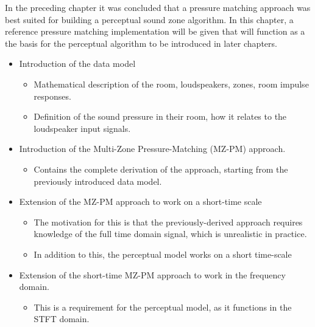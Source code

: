 In the preceding chapter it was concluded that a pressure matching approach was best suited for building a 
perceptual sound zone algorithm.
In this chapter, a reference pressure matching implementation will be given that will function as a the basis for the 
perceptual algorithm to be introduced in later chapters.
\begin{itemize}
    \item Introduction of the data model
        \begin{itemize}
            \item Mathematical description of the room, loudspeakers, zones, room impulse responses.
            \item Definition of the sound pressure in their room, how it relates to the loudspeaker input signals.
        \end{itemize}
    \item Introduction of the Multi-Zone Pressure-Matching (MZ-PM) approach.
        \begin{itemize}
            \item Contains the complete derivation of the approach, starting from the previously introduced data model.
        \end{itemize}
    \item Extension of the MZ-PM approach to work on a short-time scale
        \begin{itemize}
            \item The motivation for this is that the previously-derived approach requires knowledge of the full
                time domain signal, which is unrealistic in practice.
            \item In addition to this, the perceptual model works on a short time-scale
        \end{itemize}
    \item Extension of the short-time MZ-PM approach to work in the frequency domain.
        \begin{itemize}
            \item This is a requirement for the perceptual model, as it functions in the STFT domain.
        \end{itemize}
\end{itemize}
